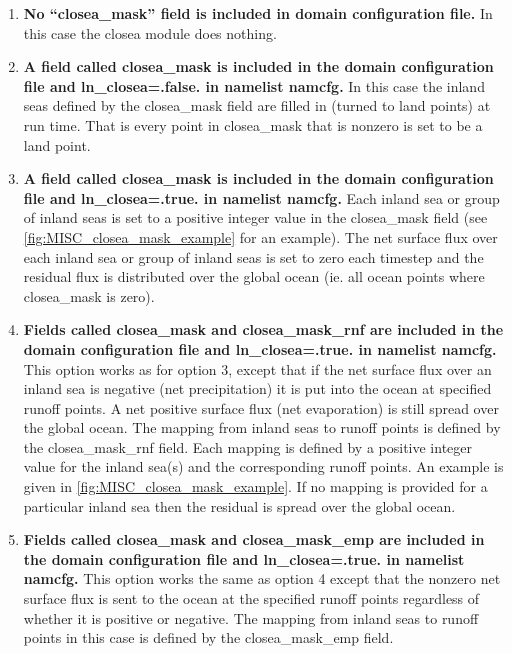 \documentclass[../main/NEMO_manual]{subfiles}
\begin{document}
\begin{enumerate}
\item {{\bfseries No ``closea\_mask'' field is included in domain configuration
  file.} In this case the closea module does nothing.}

\item {{\bfseries A field called closea\_mask is included in the domain
configuration file and ln\_closea=.false. in namelist namcfg.} In this
case the inland seas defined by the closea\_mask field are filled in
(turned to land points) at run time. That is every point in
closea\_mask that is nonzero is set to be a land point.}

\item {{\bfseries A field called closea\_mask is included in the domain
configuration file and ln\_closea=.true. in namelist namcfg.} Each
inland sea or group of inland seas is set to a positive integer value
in the closea\_mask field (see \autoref{fig:MISC_closea_mask_example}
for an example). The net surface flux over each inland sea or group of
inland seas is set to zero each timestep and the residual flux is
distributed over the global ocean (ie. all ocean points where
closea\_mask is zero).}

\item {{\bfseries Fields called closea\_mask and closea\_mask\_rnf are
included in the domain configuration file and ln\_closea=.true. in
namelist namcfg.} This option works as for option 3, except that if
the net surface flux over an inland sea is negative (net
precipitation) it is put into the ocean at specified runoff points. A
net positive surface flux (net evaporation) is still spread over the
global ocean. The mapping from inland seas to runoff points is defined
by the closea\_mask\_rnf field. Each mapping is defined by a positive
integer value for the inland sea(s) and the corresponding runoff
points. An example is given in
\autoref{fig:MISC_closea_mask_example}. If no mapping is provided for a
particular inland sea then the residual is spread over the global
ocean.}

\item {{\bfseries Fields called closea\_mask and closea\_mask\_emp are
included in the domain configuration file and ln\_closea=.true. in
namelist namcfg.} This option works the same as option 4 except that
the nonzero net surface flux is sent to the ocean at the specified
runoff points regardless of whether it is positive or negative. The
mapping from inland seas to runoff points in this case is defined by
the closea\_mask\_emp field.}
\end{enumerate}
\end{document}
